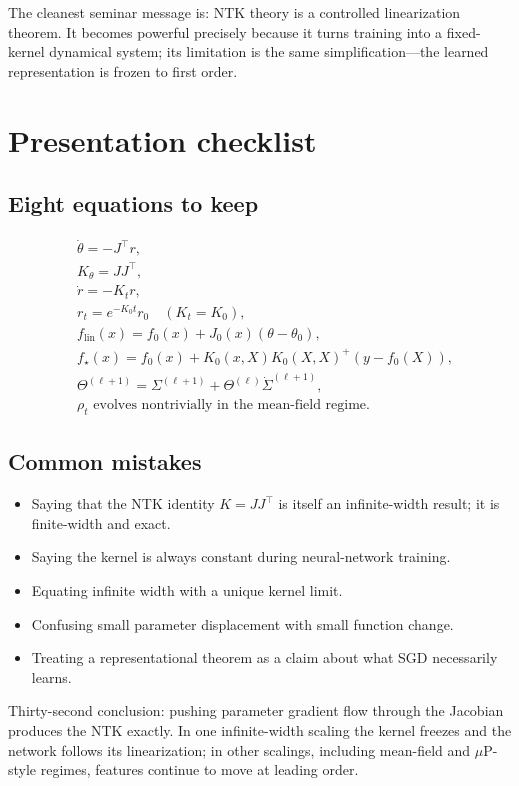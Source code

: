 \documentclass[11pt,a4paper,oneside,openany]{memoir}
\theoremstyle{definition}
\begin{document}
\begin{presentbox}
The cleanest seminar message is: NTK theory is a controlled linearization theorem.  It becomes powerful precisely because it turns training into a fixed-kernel dynamical system; its limitation is the same simplification---the learned representation is frozen to first order.
\end{presentbox}

\chapter{Presentation checklist}
\section{Eight equations to keep}
\begin{align*}
&\dot\theta=-J^\top r,\\
&K_\theta=JJ^\top,\\
&\dot r=-K_t r,\\
&r_t=e^{-K_0t}r_0\quad(K_t=K_0),\\
&f_{\mathrm{lin}}(x)=f_0(x)+J_0(x)(\theta-\theta_0),\\
&f_\star(x)=f_0(x)+K_0(x,X)K_0(X,X)^+(y-f_0(X)),\\
&\Theta^{(\ell+1)}=\Sigma^{(\ell+1)}+\Theta^{(\ell)}\dot\Sigma^{(\ell+1)},\\
&\rho_t\text{ evolves nontrivially in the mean-field regime.}
\end{align*}

\section{Common mistakes}
\begin{itemize}
\item Saying that the NTK identity $K=JJ^\top$ is itself an infinite-width result; it is finite-width and exact.
\item Saying the kernel is always constant during neural-network training.
\item Equating infinite width with a unique kernel limit.
\item Confusing small parameter displacement with small function change.
\item Treating a representational theorem as a claim about what SGD necessarily learns.
\end{itemize}

\begin{presentbox}
Thirty-second conclusion: pushing parameter gradient flow through the Jacobian produces the NTK exactly.  In one infinite-width scaling the kernel freezes and the network follows its linearization; in other scalings, including mean-field and $\mu$P-style regimes, features continue to move at leading order.
\end{presentbox}
\end{document}
